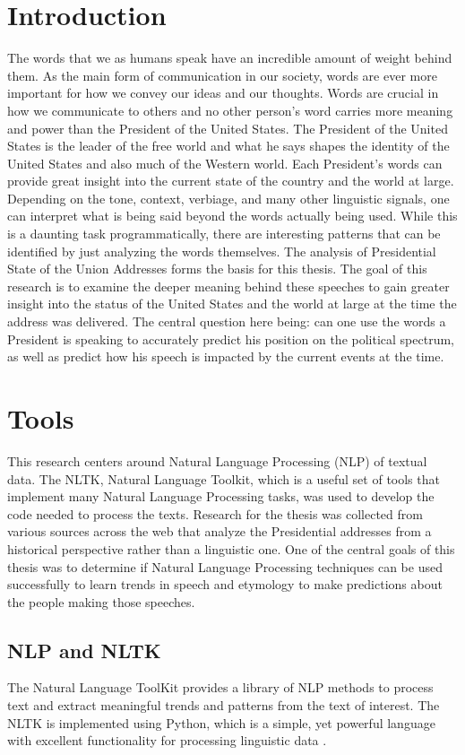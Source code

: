 \documentclass[acmtog, review, screen]{acmart}
\begin{document}
\section{Introduction}
The words that we as humans speak have an incredible amount of weight behind them.
As the main form of communication in our society, words are ever more important for how we convey our ideas and our thoughts.
Words are crucial in how we communicate to others and no other person's word carries more meaning and power than the President of the United States.
The President of the United States is the leader of the free world and what he says shapes the identity of the United States and also much of the Western world.
Each President's words can provide great insight into the current state of the country and the world at large.
Depending on the tone, context, verbiage, and many other linguistic signals, one can interpret what is being said beyond the words actually being used.
While this is a daunting task programmatically, there are interesting patterns that can be identified by just analyzing the words themselves.
The analysis of Presidential State of the Union Addresses forms the basis for this thesis. 
The goal of this research is to examine the deeper meaning behind these speeches to gain greater insight into the status of the United States and the world at large at the time the address was delivered. 
The central question here being: can one use the words a President is speaking to accurately predict his position on the political spectrum, as well as predict how his speech is impacted by the current events at the time.

\section{Tools}
This research centers around Natural Language Processing (NLP) of textual data.
The NLTK, Natural Language Toolkit, which is a useful set of tools that implement many Natural Language Processing tasks, was used to develop the code needed to process the texts.
Research for the thesis was collected from various sources across the web that analyze the Presidential addresses from a historical perspective rather than a linguistic one.
One of the central goals of this thesis was to determine if Natural Language Processing techniques can be used successfully to learn trends in speech and etymology to make predictions about the people making those speeches.

\subsection{NLP and NLTK}
The Natural Language ToolKit provides a library of NLP methods to process text and extract meaningful trends and patterns from the text of interest.
The NLTK is implemented using Python, which is a simple, yet powerful language with excellent functionality for processing linguistic data \cite{nltk}.
\end{document}
